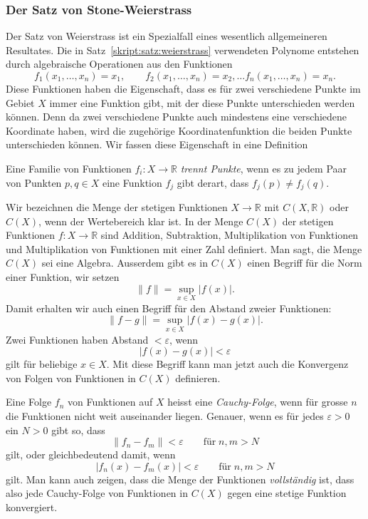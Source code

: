 \subsubsection{Der Satz von Stone-Weierstrass}
Der Satz von Weierstrass ist ein Spezialfall eines wesentlich allgemeineren
Resultates.
Die in Satz~\ref{skript:satz:weierstrass} verwendeten Polynome entstehen
durch algebraische Operationen aus den Funktionen
\[
f_1(x_1,\dots,x_n)=x_1,\qquad
f_2(x_1,\dots,x_n)=x_2,\dots
f_n(x_1,\dots,x_n)=x_n.
\]
Diese Funktionen haben die Eigenschaft, dass es für zwei verschiedene
Punkte im Gebiet $X$ immer eine Funktion gibt, mit der diese Punkte
unterschieden werden können.
Denn da zwei verschiedene Punkte auch mindestens eine verschiedene
Koordinate haben, wird die zugehörige Koordinatenfunktion die beiden
Punkte unterschieden können.
Wir fassen diese Eigenschaft in eine Definition
\begin{definition}
Eine Familie von Funktionen $f_i\colon X\to \mathbb R$ {\em trennt Punkte},
wenn es zu jedem Paar von Punkten $p,q\in X$ eine Funktion $f_j$ gibt derart,
dass $f_j(p)\ne f_j(q)$.
\end{definition}
%

Wir bezeichnen die Menge der stetigen Funktionen $X\to\mathbb R$
mit $C(X,\mathbb R)$ oder $C(X)$, wenn der Wertebereich klar ist.
In der Menge $C(X)$ der stetigen Funktionen $f\colon X\to\mathbb R$ sind
Addition, Subtraktion, Multiplikation von Funktionen und Multiplikation
von Funktionen mit einer Zahl definiert.
Man sagt, die Menge $C(X)$ sei eine Algebra.
%
Ausserdem gibt es in $C(X)$ einen Begriff für die Norm einer Funktion,
wir setzen
\begin{equation}
\| f\| = \sup_{x\in X}|f(x)|.
\label{skript:multipol:supremum-norm}
\end{equation}
%
Damit erhalten wir auch einen Begriff für den Abstand zweier Funktionen:
\[
\|f-g\| = \sup_{x\in X}|f(x)-g(x)|.
\]
Zwei Funktionen haben Abstand $< \varepsilon$, wenn
\[
|f(x)-g(x)| < \varepsilon
\]
gilt für beliebige $x\in X$.
Mit diese Begriff kann man jetzt auch die Konvergenz von Folgen von
Funktionen in $C(X)$ definieren.

Eine Folge $f_n$ von Funktionen auf $X$ heisst eine {\em Cauchy-Folge}, wenn 
%
für grosse $n$ die Funktionen nicht weit auseinander liegen.
Genauer, wenn es für jedes $\varepsilon>0$ ein $N>0$ gibt so, dass
\[
\|f_n-f_m\| < \varepsilon \qquad\text{für}\; n,m>N
\]
gilt, oder gleichbedeutend damit, wenn
\[
|f_n(x)-f_m(x)|<\varepsilon\qquad\text{für}\; n,m>N
\]
gilt.
Man kann auch zeigen, dass die Menge der Funktionen {\em vollständig} ist,
dass also jede Cauchy-Folge von Funktionen in $C(X)$ gegen eine stetige
Funktion konvergiert.
%

